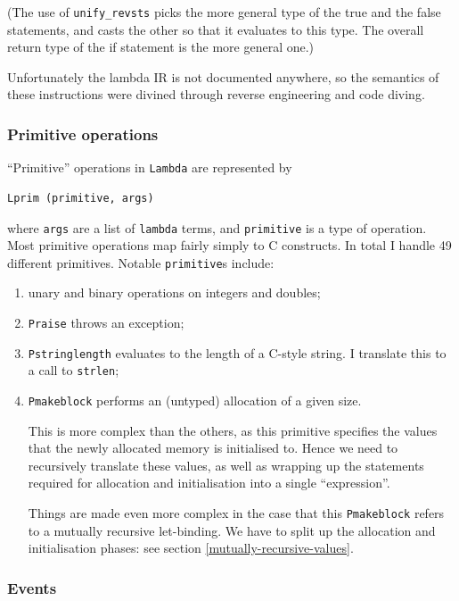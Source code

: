 \documentclass[12pt,a4paper,twoside,openright]{report}
\begin{document}
(The use of \lstinline!unify_revsts! picks the more general type of the true
and the false statements, and casts the other so that it evaluates to this type.
The overall return type of the if statement is the more general one.)

Unfortunately the lambda IR is not documented anywhere, so the semantics
of these instructions were divined through reverse engineering and code diving.

\subsubsection{Primitive operations}

``Primitive'' operations in \lstinline!Lambda! are represented by
\begin{lstlisting}
Lprim (primitive, args)\end{lstlisting}
where \lstinline!args! are a list of \lstinline!lambda! terms, and
\lstinline!primitive! is a type of operation. Most primitive operations map
fairly simply to C constructs. In total I handle 49 different primitives.
Notable \lstinline!primitive!s include:
\begin{enumerate}
  \item unary and binary operations on integers and doubles;
  \item \lstinline!Praise! throws an exception;
  \item \lstinline!Pstringlength! evaluates to the length of a C-style string. I translate this to a call to \lstinline!strlen!;
  \item \lstinline!Pmakeblock! performs an (untyped) allocation of a given size.

    This is more complex than the others, as this primitive specifies
    the values that the newly allocated memory is initialised to. Hence we need
    to recursively translate these values, as well as wrapping up the
    statements required for allocation and initialisation into a single
    ``expression''.
    
    Things are made even more complex in the case that this
    \lstinline!Pmakeblock! refers to a mutually recursive let-binding. We have
    to split up the allocation and initialisation phases: see section \ref{mutually-recursive-values}.
\end{enumerate}


\subsubsection{Events}
\end{document}

